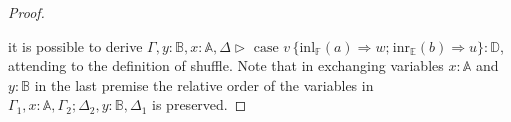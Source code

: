 \documentclass[10pt,a4paper]{amsart}
\theoremstyle{definition}
\theoremstyle{definition}
\theoremstyle{definition}
\theoremstyle{definition}
\theoremstyle{definition}
\theoremstyle{definition}
\begin{document}
\begin{proof}
\begin{figure}[H]
  \centering
  \begin{prooftree}
  \end{prooftree}
  \end{figure}

it is possible to derive $\Gamma, y:\mathbb{B}, x:\mathbb{A}, \Delta \triangleright \text{ case } v \hspace{2pt} \{\text{inl}_{\mathbb{F}} (a) \Rightarrow w ; \hspace{1pt} \text{inr}_{\mathbb{E}} (b) \Rightarrow u\}: \mathbb{D}$, attending to the definition of shuffle. Note that in exchanging  variables $x:\mathbb{A}$ and $y:\mathbb{B}$ in the last premise the relative order of the variables in $\Gamma_{1}, x:\mathbb{A},\Gamma_{2}; \Delta_{2},y:\mathbb{B},\Delta_{1}$ is preserved.






\vspace{10pt}


\end{proof}
\end{document}
